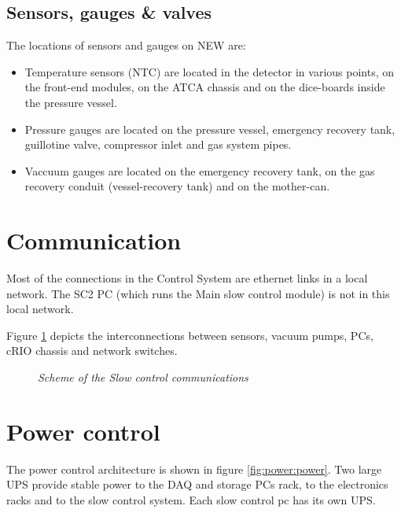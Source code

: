 \subsection{Sensors, gauges \& valves}

The locations of sensors and gauges on NEW are:

\begin{itemize}
\item Temperature sensors (NTC) are located in the detector in various points, on the front-end modules, on the ATCA chassis and on the dice-boards inside the pressure vessel. 
\item Pressure gauges are located on the pressure vessel, emergency recovery tank, guillotine valve, compressor inlet and gas system pipes.
\item Vaccuum gauges are located on the emergency recovery tank, on the gas recovery conduit (vessel-recovery tank) and on the mother-can.
\end{itemize}

\section{Communication}

Most of the connections in the Control System are ethernet links in a local network. The SC2 PC (which runs the Main slow control module) is not in this local network.

Figure \ref{fig:com:com} depicts the interconnections between sensors, vacuum pumps, PCs, cRIO chassis and network switches.

\begin{figure}[ht!]
    \bigskip
    \begin{center}\leavevmode
        \caption{\textit{Scheme of the Slow control communications}}
        \label{fig:com:com}
    \end{center}
\end{figure}

\vspace{10cm}

\section{Power control}

The power control architecture is shown in figure \ref{fig:power:power}. Two large UPS provide stable power to the DAQ and storage PCs rack, to the electronics racks and to the slow control system. 
Each slow control pc has its own UPS. 

